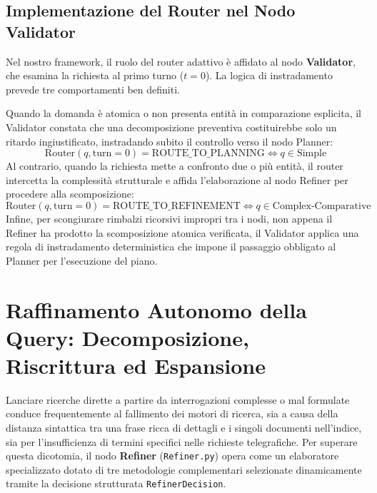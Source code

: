 \subsection{Implementazione del Router nel Nodo Validator}
Nel nostro framework, il ruolo del router adattivo è affidato al nodo \textbf{Validator}, che esamina la richiesta al primo turno ($t=0$). La logica di instradamento prevede tre comportamenti ben definiti.

Quando la domanda è atomica o non presenta entità in comparazione esplicita, il Validator constata che una decomposizione preventiva costituirebbe solo un ritardo ingiustificato, instradando subito il controllo verso il nodo Planner:
\begin{equation}
\text{Router}(q, \text{turn}=0) = \text{ROUTE\_TO\_PLANNING} \iff q \in \text{Simple}
\end{equation}
Al contrario, quando la richiesta mette a confronto due o più entità, il router intercetta la complessità strutturale e affida l'elaborazione al nodo Refiner per procedere alla scomposizione:
\begin{equation}
\text{Router}(q, \text{turn}=0) = \text{ROUTE\_TO\_REFINEMENT} \iff q \in \text{Complex-Comparative}
\end{equation}
Infine, per scongiurare rimbalzi ricorsivi impropri tra i nodi, non appena il Refiner ha prodotto la scomposizione atomica verificata, il Validator applica una regola di instradamento deterministica che impone il passaggio obbligato al Planner per l'esecuzione del piano.

\section{Raffinamento Autonomo della Query: Decomposizione, Riscrittura ed Espansione}
\label{sec:refiner_metodologie}

Lanciare ricerche dirette a partire da interrogazioni complesse o mal formulate conduce frequentemente al fallimento dei motori di ricerca, sia a causa della distanza sintattica tra una frase ricca di dettagli e i singoli documenti nell'indice, sia per l'insufficienza di termini specifici nelle richieste telegrafiche. Per superare questa dicotomia, il nodo \textbf{Refiner} (\texttt{Refiner.py}) opera come un elaboratore specializzato dotato di tre metodologie complementari selezionate dinamicamente tramite la decisione strutturata \texttt{RefinerDecision}.

